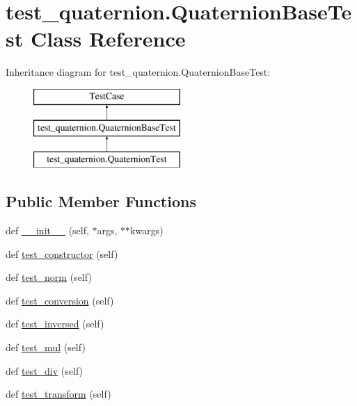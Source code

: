 \hypertarget{classtest__quaternion_1_1QuaternionBaseTest}{}\section{test\+\_\+quaternion.\+Quaternion\+Base\+Test Class Reference}
\label{classtest__quaternion_1_1QuaternionBaseTest}
Inheritance diagram for test\+\_\+quaternion.\+Quaternion\+Base\+Test\+:\begin{figure}[H]
\begin{center}
\leavevmode
\includegraphics[height=3.000000cm]{classtest__quaternion_1_1QuaternionBaseTest}
\end{center}
\end{figure}
\subsection*{Public Member Functions}
\begin{DoxyCompactItemize}
\item 
def \mbox{\hyperlink{classtest__quaternion_1_1QuaternionBaseTest_a171a0ff5c571de3b9433e5e00799f467}{\+\_\+\+\_\+init\+\_\+\+\_\+}} (self, $\ast$args, $\ast$$\ast$kwargs)
\item 
def \mbox{\hyperlink{classtest__quaternion_1_1QuaternionBaseTest_ada2ac60d65452ed38427e5eb13e4b7f8}{test\+\_\+constructor}} (self)
\item 
def \mbox{\hyperlink{classtest__quaternion_1_1QuaternionBaseTest_a277802e16cfe3518b76dca6ba6fb54a6}{test\+\_\+norm}} (self)
\item 
def \mbox{\hyperlink{classtest__quaternion_1_1QuaternionBaseTest_aefec8631d39a6ad0e62bf416e9806c20}{test\+\_\+conversion}} (self)
\item 
def \mbox{\hyperlink{classtest__quaternion_1_1QuaternionBaseTest_a893391ea74a2bad8b400368c19e33ad0}{test\+\_\+inversed}} (self)
\item 
def \mbox{\hyperlink{classtest__quaternion_1_1QuaternionBaseTest_aa3c0b3602bde030cd8743e031dfa9b46}{test\+\_\+mul}} (self)
\item 
def \mbox{\hyperlink{classtest__quaternion_1_1QuaternionBaseTest_a0e9ec1c10202bc5b4aadeff6bd47061c}{test\+\_\+div}} (self)
\item 
def \mbox{\hyperlink{classtest__quaternion_1_1QuaternionBaseTest_a161e9e423456902f536eb89e882c8f43}{test\+\_\+transform}} (self)
\end{DoxyCompactItemize}
